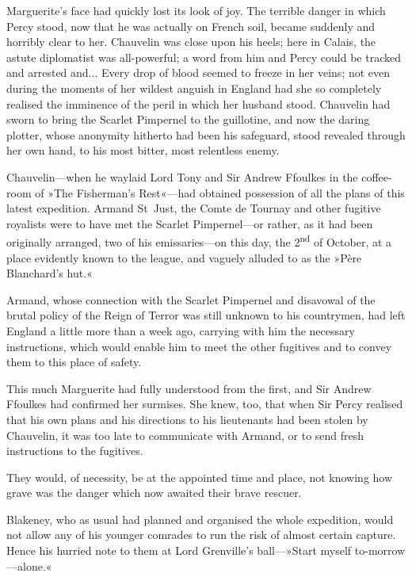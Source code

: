 Marguerite's face had quickly lost its look of joy. The terrible danger in which Percy stood, now that he was actually on French soil, became suddenly and horribly clear to her. Chauvelin was close upon his heels; here in Calais, the astute diplomatist was all-powerful; a word from him and Percy could be tracked and arrested and... Every drop of blood seemed to freeze in her veins; not even during the moments of her wildest anguish in England had she so completely realised the imminence of the peril in which her husband stood. Chauvelin had sworn to bring the Scarlet Pimpernel to the guillotine, and now the daring plotter, whose anonymity hitherto had been his safeguard, stood revealed through her own hand, to his most bitter, most relentless enemy.

Chauvelin\allowbreak---\allowbreak when he waylaid Lord Tony and Sir Andrew Ffoulkes in the coffee-room of »The Fisherman's Rest«\allowbreak---\allowbreak had obtained possession of all the plans of this latest expedition. Armand St~Just, the Comte de Tournay and other fugitive royalists were to have met the Scarlet Pimpernel\allowbreak---\allowbreak or rather, as it had been originally arranged, two of his emissaries\allowbreak---\allowbreak on this day, the 2\textsuperscript{nd} of October, at a place evidently known to the league, and vaguely alluded to as the »Père Blanchard's hut.«

Armand, whose connection with the Scarlet Pimpernel and disavowal of the brutal policy of the Reign of Terror was still unknown to his countrymen, had left England a little more than a week ago, carrying with him the necessary instructions, which would enable him to meet the other fugitives and to convey them to this place of safety.

This much Marguerite had fully understood from the first, and Sir Andrew Ffoulkes had confirmed her surmises. She knew, too, that when Sir Percy realised that his own plans and his directions to his lieutenants had been stolen by Chauvelin, it was too late to communicate with Armand, or to send fresh instructions to the fugitives.

They would, of necessity, be at the appointed time and place, not knowing how grave was the danger which now awaited their brave rescuer.

Blakeney, who as usual had planned and organised the whole expedition, would not allow any of his younger comrades to run the risk of almost certain capture. Hence his hurried note to them at Lord Grenville's ball\allowbreak---\allowbreak »Start myself to-morrow\allowbreak---\allowbreak alone.«

